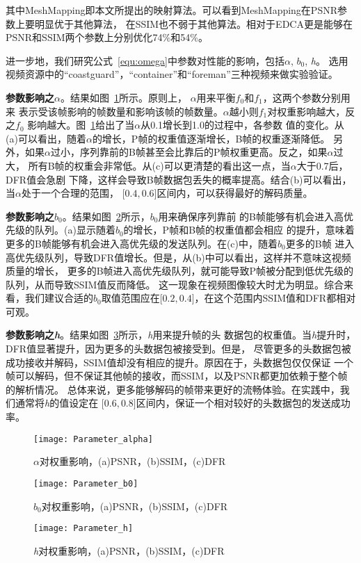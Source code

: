 其中MeshMapping即本文所提出的映射算法。可以看到MeshMapping在PSNR参数上要明显优于其他算法，
在SSIM也不弱于其他算法。相对于EDCA更是能够在PSNR和SSIM两个参数上分别优化74\%和54\%。

进一步地，我们研究公式~\ref{equ:omega}中参数对性能的影响，包括$\alpha$, $b_{0}$, \emph{h}。
选用视频资源中的“coastguard”，“container”和“foreman”三种视频来做实验验证。

\textbf{参数影响之$\alpha$}。结果如图~\ref{fig:parameter_alpha}所示。原则上，
$\alpha$用来平衡$f_{0}$和$f_{1}$，这两个参数分别用来
表示受该帧影响的帧数量和影响该帧的帧数量。$\alpha$越小则$f_{1}$对权重影响越大，反之$f_{0}$
影响越大。图~\ref{fig:parameter_alpha}给出了当$\alpha$从0.1增长到1.0的过程中，各参数
值的变化。从(a)可以看出，随着$\alpha$的增长，P帧的权重值逐渐增长，B帧的权重逐渐降低。
另外，如果$\alpha$过小，序列靠前的B帧甚至会比靠后的P帧权重更高。反之，如果$\alpha$过大，
所有B帧的权重会非常低。从(c)可以更清楚的看出这一点，当$\alpha$大于0.7后，DFR值会急剧
下降，这样会导致B帧数据包丢失的概率提高。结合(b)可以看出，当$\alpha$处于一个合理的范围，
$\lbrack0.4,0.6\rbrack$区间内，可以获得最好的解码质量。

\textbf{参数影响之$b_{0}$}。结果如图~\ref{fig:parameter_b0}所示，$b_{0}$用来确保序列靠前
的B帧能够有机会进入高优先级的队列。(a)显示随着$b_{0}$的增长，P帧和B帧的权重值都会相应
的提升，意味着更多的B帧能够有机会进入高优先级的发送队列。在(c)中，随着$b_{0}$更多的B帧
进入高优先级队列，导致DFR值增长。但是，从(b)中可以看出，这样并不意味这视频质量的增长，
更多的B帧进入高优先级队列，就可能导致P帧被分配到低优先级的队列，从而导致SSIM值反而降低。
这一现象在视频图像较大时尤为明显。综合来看，我们建议合适的$b_{0}$取值范围应在$\lbrack0.2,
0.4\rbrack$，在这个范围内SSIM值和DFR都相对可观。

\textbf{参数影响之\emph{h}}。结果如图~\ref{fig:parameter_h}所示，\emph{h}用来提升帧的头
数据包的权重值。当\emph{h}提升时，DFR值显著提升，因为更多的头数据包被接受到。但是，
尽管更多的头数据包被成功接收并解码，SSIM值却没有相应的提升。原因在于，头数据包仅仅保证
一个帧可以解码，但不保证其他帧的接收，而SSIM，以及PSNR都更加依赖于整个帧的解析情况。
总体来说，更多能够解码的帧带来更好的流畅体验。在实践中，我们通常将\emph{h}的值设定在
$\lbrack0.6,0.8\rbrack$区间内，保证一个相对较好的头数据包的发送成功率。

\begin{figure}[H] %
  \centering
  \texttt{[image: Parameter\_alpha]}
  \caption{$\alpha$对权重影响，(a)PSNR，(b)SSIM，(c)DFR}
  \label{fig:parameter_alpha}
\end{figure}
\begin{figure}[H] %
  \centering
  \texttt{[image: Parameter\_b0]}
  \caption{$b_{0}$对权重影响，(a)PSNR，(b)SSIM，(c)DFR}
  \label{fig:parameter_b0}
\end{figure}
\begin{figure}[H] %
  \centering
  \texttt{[image: Parameter\_h]}
  \caption{\emph{h}对权重影响，(a)PSNR，(b)SSIM，(c)DFR}
  \label{fig:parameter_h}
\end{figure}

